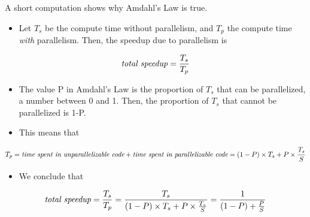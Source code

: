 \documentclass[letterpaper,10pt,english]{sphinxmanual}
\begin{document}
A short computation shows why Amdahl's Law is true.
\begin{itemize}
\item {} 
Let $T_s$ be the compute time without parallelism, and $T_p$ the compute time \emph{with} parallelism. Then, the speedup due to parallelism is

\end{itemize}
\begin{gather}
\begin{split}\textit{total speedup} = \frac{T_s}{T_p}\end{split}\notag
\end{gather}\begin{itemize}
\item {} 
The value P in Amdahl's Law is the proportion of $T_s$ that can be parallelized, a number between 0 and 1. Then, the proportion of $T_s$ that cannot be parallelized is 1-P.

\item {} 
This means that

\end{itemize}
\begin{gather}
\begin{split}T_p = \textit{time spent in unparallelizable code} + \textit{time spent in parallelizable code} = (1 - P) \times T_s + P \times \frac{T_s}{S}\end{split}\notag
\end{gather}\begin{itemize}
\item {} 
We conclude that

\end{itemize}
\begin{gather}
\begin{split}\textit{total speedup} = \frac{T_s}{T_p} = \frac{T_s}{(1 - P) \times T_s + P \times \frac{T_s}{S}} = \frac{1}{(1-P) +  \frac{P}{S}}\end{split}\notag
\end{gather}
\end{document}
